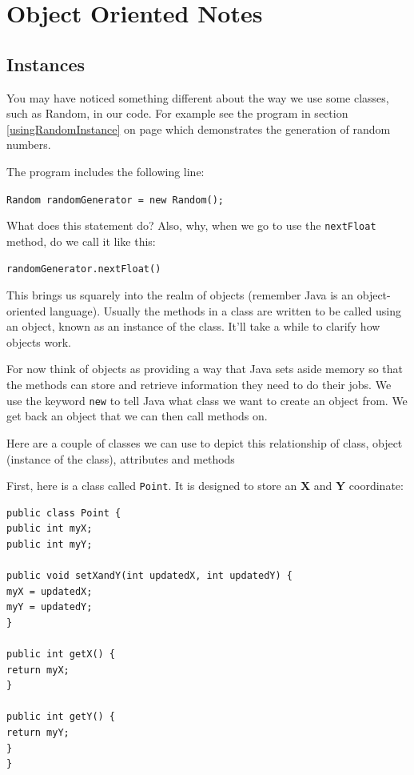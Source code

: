 
\chapter{Object Oriented Notes}

\label{ooconcepts}

\section{Instances}


You may have noticed something different about the way we use some classes, such as Random, in our code. For example see the program in section \ref{usingRandomInstance} on page \pageref{usingRandomInstance} which demonstrates the generation of random numbers. 

The program includes the following line:

\texttt{Random randomGenerator = new Random();}

What does this statement do? Also, why, when we go to use the \texttt{nextFloat} method, do we call it like this:

\texttt{randomGenerator.nextFloat()}

This brings us squarely into the realm of objects (remember Java is an object-oriented language). Usually the methods in a class are written to be called using an object, known as an instance of the class. It'll take a while to clarify how objects work. 

For now think of objects as providing a way that Java sets aside memory so that the methods can store and retrieve information they need to do their jobs. We use the keyword \texttt{new} to tell Java what class we want to create an object from. We get back an object that we can then call methods on.

Here are a couple of classes we can use to depict this relationship of class, object (instance of the class), attributes and methods

First, here is a class called \texttt{Point}. It is designed to store an \textbf{X} and \textbf{Y} coordinate:


\beforeverb
\begin{verbatim}
public class Point {
public int myX;
public int myY;

public void setXandY(int updatedX, int updatedY) {
myX = updatedX;
myY = updatedY;
}

public int getX() {
return myX;
}

public int getY() {
return myY;
}
}
\end{verbatim}
\afterverb

